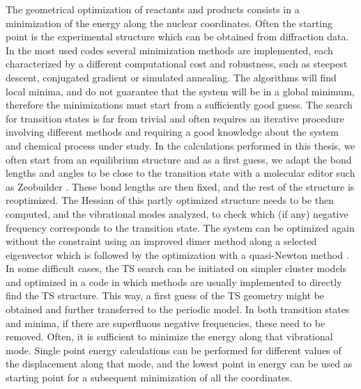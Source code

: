 The geometrical optimization of reactants and products consists in a minimization of the energy along the nuclear coordinates. Often the starting point is the experimental structure which can be obtained from diffraction data. In the most used codes several minimization methods are implemented, each characterized by a different computational cost and robustness, such as steepest descent, conjugated gradient or simulated annealing. The algorithms will find local minima, and do not guarantee that the system will be in a global minimum, therefore the minimizations must start from a sufficiently good guess. 
The search for transition states is far from trivial and often requires an iterative procedure involving different methods and requiring a good knowledge about the system and chemical process under study. In the calculations performed in this thesis, we often start from an equilibrium structure and as a first guess, we adapt the bond lengths and angles to be close to the transition state with a molecular editor such as Zeobuilder \cite{Verstraelen2008}. These bond lengths are then fixed, and the rest of the structure is reoptimized. The Hessian of this partly optimized structure needs to be then computed, and the vibrational modes analyzed, to check which (if any) negative frequency corresponds to the transition state. The system can be optimized again without the constraint using an improved dimer method along a selected eigenvector \cite{Heyden2005} which is followed by the optimization with a quasi-Newton method \cite{Press1989}. In some difficult cases, the TS search can be initiated on simpler cluster models and optimized in a code in which methods are usually implemented to directly find the TS structure. This way, a first guess of the TS geometry might be obtained and further transferred to the periodic model. In both transition states and minima, if there are superfluous negative frequencies, these need to be removed. Often, it is sufficient to minimize the energy along that vibrational mode. Single point energy calculations can be performed for different values of the displacement along that mode, and the lowest point in energy can be used as starting point for a subsequent minimization of all the coordinates.

